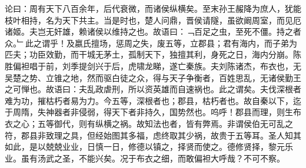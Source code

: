 {论曰：周有天下八百余年，后代衰微，而诸侯纵横矣。至末孙王赧降为庶人，犹能枝叶相持，名为天下共主。当是时也，楚人问鼎，晋侯请隧，虽欲阚周室，而见厄诸姬。夫岂无奸雄，赖诸侯以维持之也。故语曰：﹁百足之虫，至死不僵。持之者众。﹂此之谓乎！及嬴氏擅场，惩周之失，废五等，立郡县；君有海内，而子弟为匹夫；功臣效勤，而干城无茅土，孤制天下，独擅其利，身死之日，海内分崩。陈胜偏袒唱于前，刘季提剑兴于后，虎啸龙睇，遂亡秦族。夫刘陈诸杰，布衣也，无吴楚之势、立锥之地，然而驱白徒之众，得与天子争衡者，百姓思乱，无诸侯勤王之可惮也。故语曰：夫乱政虐刑，所以资英雄而自速祸也。此之谓矣。夫伐深根者难为功，摧枯朽者易为力。今五等，深根者也；郡县，枯朽者也。故自秦以下，迄于周隋，失神器者非侵弱，得天下者非持久，国势然也。呜呼！郡县而理，则生布衣之心；五等御代，则有纵横之祸。故知法也者，皆有弊焉。非谓侯伯无可乱之符，郡县非致理之具，但经始图其多福，虑终取其少祸，故贵于五等耳。圣人知其如此，是以兢兢业业，日慎一日，修德以镇之，择贤而使之。德修贤择，黎元乐业。虽有汤武之圣，不能兴矣。况于布衣之细，而敢偏袒大呼哉？不可不察。
%
%
}
